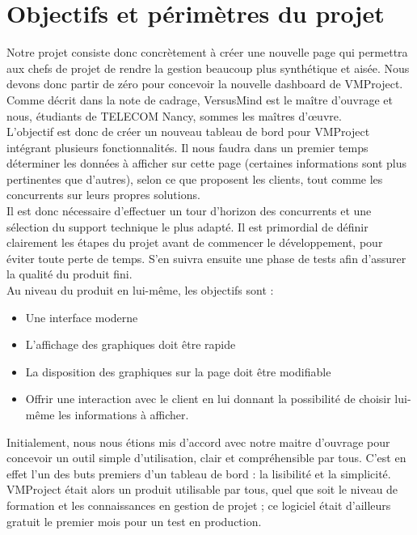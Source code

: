 \documentclass[12pt]{report}
\begin{document}
  \section{Objectifs et périmètres du projet}
  
Notre projet consiste donc concrètement à créer une nouvelle page qui permettra aux chefs de projet de rendre la gestion beaucoup plus synthétique et aisée. Nous devons donc partir de zéro pour concevoir la nouvelle dashboard de VMProject. Comme décrit dans la note de cadrage, VersusMind est le maître d’ouvrage et nous, étudiants de TELECOM Nancy, sommes les maîtres d’œuvre.\\

L’objectif est donc de créer un nouveau tableau de bord pour VMProject intégrant plusieurs fonctionnalités. Il nous faudra dans un premier temps déterminer les données à afficher sur cette page (certaines informations sont plus pertinentes que d’autres), selon ce que proposent les clients, tout comme les concurrents sur leurs propres solutions.\\

Il est donc nécessaire d’effectuer un tour d’horizon des concurrents et une sélection du support technique le plus adapté. Il est primordial de définir clairement les étapes du projet avant de commencer le développement, pour éviter toute perte de temps. S’en suivra ensuite une phase de tests afin d’assurer la qualité du produit fini.\\

Au niveau du produit en lui-même, les objectifs sont :\\
\begin{itemize}
\item Une interface moderne
\item L’affichage des graphiques doit être rapide
\item La disposition des graphiques sur la page doit être modifiable
\item Offrir une interaction avec le client en lui donnant la possibilité de choisir lui-même les informations à afficher.\\
\end{itemize}

Initialement, nous nous étions mis d’accord avec notre maitre d’ouvrage pour concevoir un outil simple d’utilisation, clair et compréhensible par tous. C’est en effet l’un des buts premiers d’un tableau de bord : la lisibilité et la simplicité. VMProject était alors un produit utilisable par tous, quel que soit le niveau de formation et les connaissances en gestion de projet ; ce logiciel était d’ailleurs gratuit le premier mois pour un test en production.\\
\end{document}
